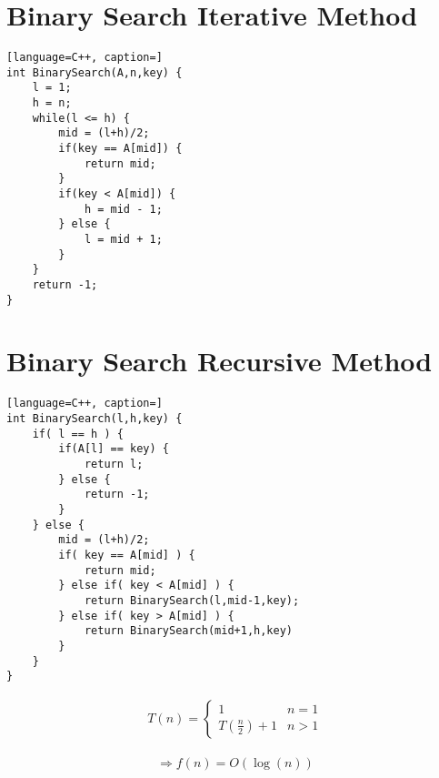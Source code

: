 \documentclass[12pt]{article}
\begin{document}
\newpage




\section{Binary Search Iterative Method}





\begin{lstlisting}[language=C++, caption=]
int BinarySearch(A,n,key) {
	l = 1;
	h = n;
	while(l <= h) {
		mid = (l+h)/2;
		if(key == A[mid]) {
			return mid;
		}
		if(key < A[mid]) {
			h = mid - 1;
		} else {
			l = mid + 1;
		}
	}
	return -1;
}
\end{lstlisting}





\newpage



\section{Binary Search Recursive Method}




\begin{lstlisting}[language=C++, caption=]
int BinarySearch(l,h,key) {
	if( l == h ) {
		if(A[l] == key) {
			return l;
		} else {
			return -1;
		}
	} else {
		mid = (l+h)/2;
		if( key == A[mid] ) {
			return mid;
		} else if( key < A[mid] ) {
			return BinarySearch(l,mid-1,key);
		} else if( key > A[mid] ) {
			return BinarySearch(mid+1,h,key)
		}
	}
}
\end{lstlisting}





\begin{align*}
T(n) = 
\begin{cases}
1 & n=1 \\
T(\frac{n}{2}) + 1 & n > 1
\end{cases}
\end{align*}

\begin{align*}
\Rightarrow f(n) = O(\log{(n)})
\end{align*}
\end{document}
